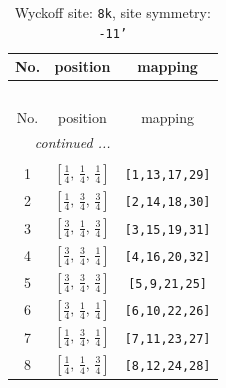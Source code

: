 \documentclass[fleqn,8pt]{jsarticle}
\begin{document}
\renewcommand{\arraystretch}{1.2}
\begin{longtable}{ccc}
\caption{Wyckoff site: {\tt 8k}, site symmetry: {\tt -11'}}
 \\
 \hline \hline
No. & position & mapping \\ \hline \endfirsthead

\multicolumn{2}{l}{\tablename\ \thetable{}} \\
 \hline \hline
No. & position & mapping \\ \hline \endhead

 \hline \hline
\multicolumn{2}{r}{\footnotesize\it continued ...} \\ \endfoot

 \hline \hline
\multicolumn{2}{r}{} \\ \endlastfoot

1 & $\left[ \frac{1}{4},\, \frac{1}{4},\, \frac{1}{4} \right]$ & {\tt [1,13,17,29]} \\ \hline
2 & $\left[ \frac{1}{4},\, \frac{3}{4},\, \frac{3}{4} \right]$ & {\tt [2,14,18,30]} \\ \hline
3 & $\left[ \frac{3}{4},\, \frac{1}{4},\, \frac{3}{4} \right]$ & {\tt [3,15,19,31]} \\ \hline
4 & $\left[ \frac{3}{4},\, \frac{3}{4},\, \frac{1}{4} \right]$ & {\tt [4,16,20,32]} \\ \hline
5 & $\left[ \frac{3}{4},\, \frac{3}{4},\, \frac{3}{4} \right]$ & {\tt [5,9,21,25]} \\ \hline
6 & $\left[ \frac{3}{4},\, \frac{1}{4},\, \frac{1}{4} \right]$ & {\tt [6,10,22,26]} \\ \hline
7 & $\left[ \frac{1}{4},\, \frac{3}{4},\, \frac{1}{4} \right]$ & {\tt [7,11,23,27]} \\ \hline
8 & $\left[ \frac{1}{4},\, \frac{1}{4},\, \frac{3}{4} \right]$ & {\tt [8,12,24,28]} \\
\end{longtable}
\renewcommand{\arraystretch}{1.2}
\end{document}
